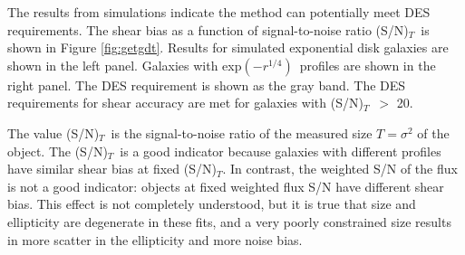 \documentclass[12pt]{article}
\newcommand{\devprof}{exp$(-r^{1/4})$}
\newcommand{\sncut}{20}
\newcommand{\snsize}{(S/N)$_{T}$}
\begin{document}
The results from simulations indicate the method can potentially meet DES
requirements.  The shear bias as a function of signal-to-noise ratio \snsize\
is shown in Figure \ref{fig:getgdt}.  Results for simulated exponential disk galaxies
are shown in the left panel.  Galaxies with \devprof\ profiles are shown in the
right panel.  The DES requirement is shown as the gray band.  The DES
requirements for shear accuracy are met for galaxies with \snsize\ $>$
\sncut.  

The value \snsize\ is the signal-to-noise ratio of the measured size
$T=\sigma^2$ of the object.  The \snsize\ is a good indicator because galaxies
with different profiles have similar shear bias at fixed \snsize.  In contrast,
the weighted S/N of the flux is not a good indicator: objects at fixed weighted
flux S/N have different shear bias.  This effect is not completely understood,
but it is true that size and ellipticity are degenerate in these fits, and a
very poorly constrained size results in more scatter in the ellipticity and
more noise bias.
\end{document}
